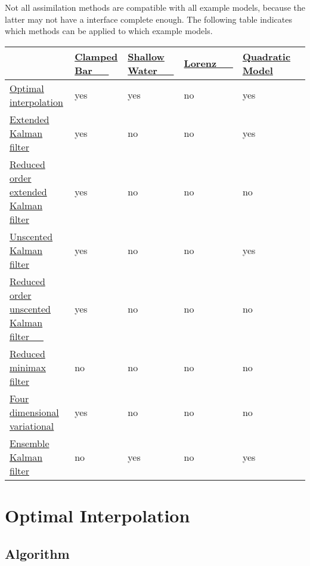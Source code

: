 \documentclass{tufte-book}
\begin{document}
\-Not all assimilation  methods are compatible with all example models, because the latter may not have a interface complete enough. \-The following table indicates which methods can be applied to which example models.

\begin{tabular}{|l|l|l|l|l|l|}
\hline
&\hyperlink{models}{\-Clamped \-Bar~~~} &\hyperlink{models}{\-Shallow \-Water~~~} &\hyperlink{models}{\-Lorenz~~~} &\hyperlink{models}{\-Quadratic \-Model}  \\
\hline
\hyperlink{optimal_interpolation}{\-Optimal interpolation}  &{\ttfamily yes} &{\ttfamily yes} &{\ttfamily no} &{\ttfamily yes}  \\
\hyperlink{extended_kalman_filter}{\-Extended \-Kalman filter}  &{\ttfamily yes} &{\ttfamily no} &{\ttfamily no} &{\ttfamily yes}  \\
\hyperlink{reduced_order_extended_kalman_filter}{\-Reduced order extended \-Kalman filter}  &{\ttfamily yes} &{\ttfamily no} &{\ttfamily no} &{\ttfamily no}  \\
\hyperlink{unscented_kalman_filter}{\-Unscented \-Kalman filter}  &{\ttfamily yes} &{\ttfamily no} &{\ttfamily no} &{\ttfamily yes}  \\
\hyperlink{reduced_order_unscented_kalman_filter}{\-Reduced order unscented \-Kalman filter~~~}  &{\ttfamily yes} &{\ttfamily no} &{\ttfamily no} &{\ttfamily no}  \\
\hyperlink{reduced_minimax_filter}{\-Reduced minimax filter}  &{\ttfamily no} &{\ttfamily no} &{\ttfamily no} &{\ttfamily no}  \\
\hyperlink{four_dimensional_variational}{\-Four dimensional variational}  &{\ttfamily yes} &{\ttfamily no} &{\ttfamily no} &{\ttfamily no}  \\
\hyperlink{ensemble_kalman_filter}{\-Ensemble \-Kalman filter}  &{\ttfamily no} &{\ttfamily yes} &{\ttfamily no} &{\ttfamily yes}  \\
\hline
\end{tabular}


\hypertarget{optimal_interpolation}{}\section{\-Optimal Interpolation}\label{optimal_interpolation}


\hypertarget{optimal_interpolation_oi_algorithm}{}\subsection{\-Algorithm}\label{optimal_interpolation_oi_algorithm}
\end{document}
